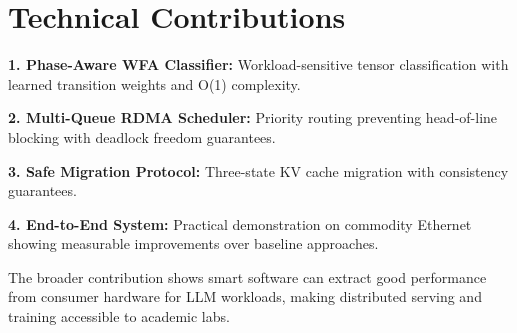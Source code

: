 \documentclass[10pt,letterpaper]{article}
\begin{document}
\section{Technical Contributions}

\textbf{1. Phase-Aware WFA Classifier:} Workload-sensitive tensor classification with learned transition weights and O(1) complexity.

\textbf{2. Multi-Queue RDMA Scheduler:} Priority routing preventing head-of-line blocking with deadlock freedom guarantees.

\textbf{3. Safe Migration Protocol:} Three-state KV cache migration with consistency guarantees.

\textbf{4. End-to-End System:} Practical demonstration on commodity Ethernet showing measurable improvements over baseline approaches.

The broader contribution shows smart software can extract good performance from consumer hardware for LLM workloads, making distributed serving and training accessible to academic labs.
\end{document}
